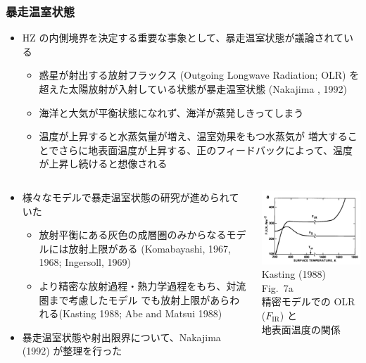 \documentclass[aspectratio=149,9pt,]{beamer}
\begin{document}
\begin{frame}
	\frametitle{暴走温室状態}
	\begin{itemize}
		\item HZ の内側境界を決定する重要な事象として、暴走温室状態が議論されている
			\begin{itemize}
				\item 惑星が射出する放射フラックス (Outgoing Longwave Radiation; OLR)
					を超えた太陽放射が入射している状態が暴走温室状態 (Nakajima \etal*, 1992)
				\item 海洋と大気が平衡状態になれず、海洋が蒸発しきってしまう
				\item 温度が上昇すると水蒸気量が増え、温室効果をもつ水蒸気が
					増大することでさらに地表面温度が上昇する、正のフィードバックによって、温度
					が上昇し続けると想像される
			\end{itemize}
	\end{itemize}
	\begin{columns}[T,onlytextwidth]
		\begin{column}{.65\textwidth}
			\begin{itemize}
				\item 様々なモデルで暴走温室状態の研究が進められていた
					\begin{itemize}
						\item 放射平衡にある灰色の成層圏のみからなるモデルには放射上限がある
							(Komabayashi, 1967, 1968; Ingersoll, 1969)
						\item より精密な放射過程・熱力学過程をもち、対流圏まで考慮したモデル
							でも放射上限があらわれる(Kasting 1988; Abe and Matsui 1988)
					\end{itemize}
				\item 暴走温室状態や射出限界について、Nakajima \etal (1992) が整理を行った
			\end{itemize}
		\end{column}
		\begin{column}{.3\textwidth}
			\centering\small
			\includegraphics[width=.95\textwidth]{kasting7a.png}\\
			Kasting (1988) Fig.\ 7a\\
			精密モデルでの OLR (\(F_{\mathrm{IR}}\)) と\\
			地表面温度の関係
		\end{column}
	\end{columns}
\end{frame}
\end{document}
